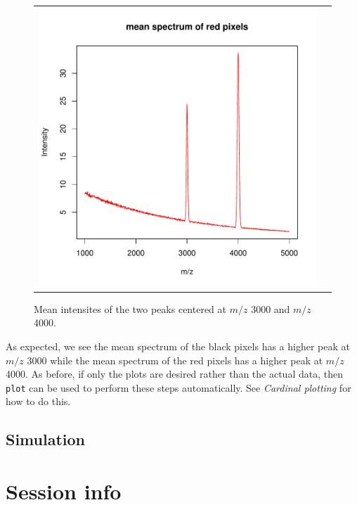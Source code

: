 \documentclass[a4paper]{article}
\begin{document}
\begin{figure}
\begin{center}
\begin{tabular}{cc}
\includegraphics{Cardinal-demo-077}
\end{tabular}
\caption{\small Mean intensites of the two peaks centered at $m/z$ 3000 and $m/z$ 4000.}
\end{center}
\end{figure}
As expected, we see the mean spectrum of the black pixels has a higher peak at $m/z$ 3000 while the mean spectrum of the red pixels has a higher peak at $m/z$ 4000. As before, if only the plots are desired rather than the actual data, then \verb|plot| can be used to perform these steps automatically. See \textit{Cardinal plotting} for how to do this.


\subsection{Simulation}





\section{Session info}
\end{document}
